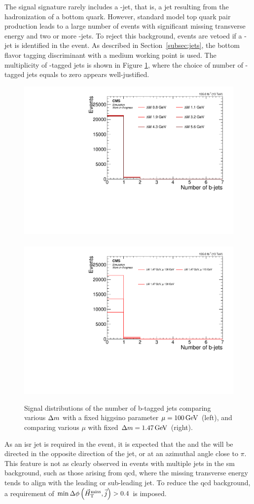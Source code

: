 The signal signature rarely includes a \PQb-jet, that is, a jet resulting from the hadronization of a bottom quark. However, standard model top quark pair production leads to a large number of events with significant missing transverse energy and two or more \PQb-jets. To reject this background, events are vetoed if a \PQb-jet is identified in the event. As described in Section~\ref{subsec:jets}, the \DEEPCSV bottom flavor tagging discriminant with a medium working point is used. The multiplicity of \PQb-tagged jets is shown in Figure \ref{fig:signal-bjets}, where the choice of number of \PQb-tagged jets equals to zero appears well-justified. 

\begin{figure}[!htb]
\centering
\includegraphics[width=0.48\linewidth]{plots/signal_common_distributions_fixed_mu/none_BTagsDeepMedium.pdf} \,
\includegraphics[width=0.48\linewidth]{plots/signal_common_distributions_fixed_dm/none_BTagsDeepMedium.pdf}  \\
\caption[Signal number of b-tagged jets distributions]{ Signal distributions of the number of b-tagged jets comparing various $\Delta m$ with a fixed higgsino parameter $\mu=100\,\text{Ge\hspace{-.08em}V}$ (left), and comparing various $\mu$ with fixed $\Delta m=1.47\,\text{Ge\hspace{-.08em}V}$ (right).}
\label{fig:signal-bjets}
\end{figure}

As an \gls{isr} jet is required in the event, it is expected that the \MET and the \mht will be directed in the opposite direction of the jet, or at an azimuthal angle close to $\pi$. This feature is not as clearly observed in events with multiple jets in the \gls{sm} background, such as those arising from \gls{qcd}, where the missing transverse energy tends to align with the leading or sub-leading jet. To reduce the \gls{qcd} background, a requirement of $\min{\Delta\phi\left(\ensuremath{\vec{H}_{\text{T}}^{\text{miss}}},\vec{j}\right)} > 0.4$ is imposed.

